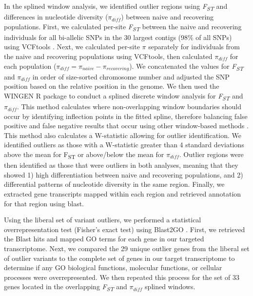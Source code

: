 \documentclass[9pt,twocolumn,twoside,lineno]{pnas-new}
\begin{document}
{In the splined window analysis, we identified outlier regions using
\emph{F\textsubscript{ST}} and differences in nucleotide diversity
(\(\pi_{diff}\)) between naive and recovering populations. First, we
calculated per-site \emph{F\textsubscript{ST}} between the naive and
recovering individuals for all bi-allelic SNPs in the 30 largest contigs
(98\% of all SNPs) using VCFtools \citep{danecek2011}. Next, we
calculated per-site \(\pi\) separately for individuals from the naive
and recovering populations using VCFtools, then calculated
\(\pi_{diff}\) for each population
(\(\pi_{diff} = \pi_{naive} - \pi_{recovering}\)). We concatenated the
values for \emph{F\textsubscript{ST}} and \(\pi_{diff}\) in order of
size-sorted chromosome number and adjusted the SNP position based on the
relative position in the genome. We then used the WINGEN R package
\citep{bishop2023} to conduct a splined discrete window analysis for
\emph{F\textsubscript{ST}} and \(\pi_{diff}\). This method calculates
where non-overlapping window boundaries should occur by identifying
inflection points in the fitted spline, therefore balancing false
positive and false negative results that occur using other window-based
methods \citep{beissinger2015} . This method also calculates a
W-statistic allowing for outlier identification. We identified outliers
as those with a W-statistic greater than 4 standard deviations above the
mean for F\textsubscript{ST} or above/below the mean for \(\pi_{diff}\).
Outlier regions were then identified as those that were outliers in both
analyses, meaning that they showed 1) high differentiation between naive
and recovering populations, and 2) differential patterns of nucleotide
diversity in the same region. Finally, we extracted gene transcripts
mapped within each region and retrieved annotation for that region using
blast.

Using the liberal set of variant outliers, we performed a statistical
overrepresentation test (Fisher's exact test) using Blast2GO
\citep{conesa2005}. First, we retrieved the Blast hits and mapped GO
terms for each gene in our targeted transcriptome. Next, we compared the
29 unique outlier genes from the liberal set of outlier variants to the
complete set of genes in our target transcriptome to determine if any GO
biological functions, molecular functions, or cellular processes were
overrepresented. We then repeated this process for the set of 33 genes
located in the overlapping \emph{F\textsubscript{ST}} and \(\pi_{diff}\)
splined windows.

\hypertarget{frog-population-recovery-1}{%
}}
\end{document}
